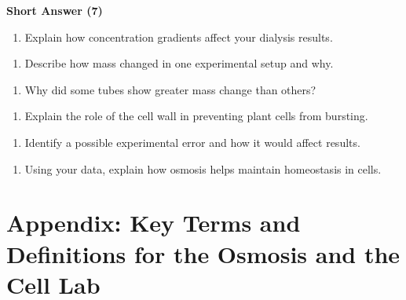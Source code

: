 \documentclass[
  letterpaper,
  DIV=11,
  numbers=noendperiod]{scrreprt}
\providecommand{\tightlist}{%
  \setlength{\itemsep}{0pt}\setlength{\parskip}{0pt}}
\begin{document}
\textbf{Short Answer (7)}

\begin{enumerate}
\def\labelenumi{\arabic{enumi}.}
\setcounter{enumi}{8}
\tightlist
\item
  Explain how concentration gradients affect your dialysis results.
\end{enumerate}

\begin{enumerate}
\def\labelenumi{\arabic{enumi}.}
\setcounter{enumi}{9}
\tightlist
\item
  Describe how mass changed in one experimental setup and why.
\end{enumerate}

\begin{enumerate}
\def\labelenumi{\arabic{enumi}.}
\setcounter{enumi}{10}
\tightlist
\item
  Why did some tubes show greater mass change than others?
\end{enumerate}

\begin{enumerate}
\def\labelenumi{\arabic{enumi}.}
\setcounter{enumi}{12}
\tightlist
\item
  Explain the role of the cell wall in preventing plant cells from
  bursting.
\end{enumerate}

\begin{enumerate}
\def\labelenumi{\arabic{enumi}.}
\setcounter{enumi}{13}
\tightlist
\item
  Identify a possible experimental error and how it would affect
  results.
\end{enumerate}

\begin{enumerate}
\def\labelenumi{\arabic{enumi}.}
\setcounter{enumi}{14}
\tightlist
\item
  Using your data, explain how osmosis helps maintain homeostasis in
  cells.
\end{enumerate}

\section{\texorpdfstring{\textbf{Appendix: Key Terms and Definitions for
the Osmosis and the Cell
Lab}}{Appendix: Key Terms and Definitions for the Osmosis and the Cell Lab}}\label{appendix-key-terms-and-definitions-for-the-osmosis-and-the-cell-lab}
\end{document}
